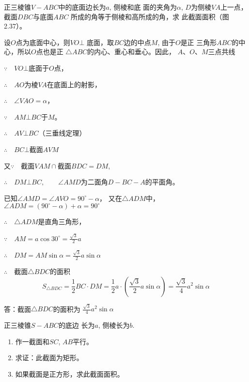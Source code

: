 \begin{example}
    正三棱锥$V-ABC$中的底面边长为$a$, 侧棱和底
面的夹角为$\alpha$, $D$为侧棱$VA$上一点，截面$DBC$与底面$ABC$
所成的角等于侧棱和高所成的角，求
此截面面积（图2.37）。
\end{example}


\begin{solution}
    设$O$点为底面中心，则$VO\bot$
底面，取$BC$边的中点$M$, 由于$O$是正
三角形$ABC$的中心，所以$O$点也是正
$\triangle ABC$的内心、重心和垂心。因此，
$A$、$O$、$M$三点共线

$\because\quad VO\bot$底面于$O$点，

$\therefore\quad AO$为棱$VA$在底面上的射影，

$\therefore\quad \angle VAO=\alpha$，

$\because\quad AM\bot BC$于$M$。

$\therefore\quad AV\bot BC$\qquad （三垂线定理）

$\therefore\quad BC\bot$截面$AVM$

又$\because\quad $截面$VAM\cap$截面$BDC=DM$, 

$\therefore\quad DM\bot BC,\qquad \angle AMD$为二面角$D-BC-A$的平面角。

已知$\angle AMD=\angle AVO=90^{\circ}-\alpha$，
又在$\triangle ADM$中，$\angle ADM=(90^{\circ}-\alpha)+\alpha=90^{\circ}$

$\therefore\quad \triangle ADM$是直角三角形，

$\because\quad AM=a\cos 30^{\circ}=\frac{\sqrt{3}}{2}a$

$\therefore\quad DM=AM\sin\alpha=\frac{\sqrt{3}}{2}a\sin\alpha$

$\therefore\quad $截面$\triangle BDC$的面积
\[S_{\triangle BDC}=\frac{1}{2}BC\cdot DM=\frac{1}{2}a\cdot \left(\frac{\sqrt{3}}{2}a\sin\alpha\right)=\frac{\sqrt{3}}{4}a^2\sin\alpha\]

答：截面$\triangle BDC$的面积为
$\frac{\sqrt{3}}{4}a^2\sin\alpha$
\end{solution}

\begin{example}
    正三棱锥$S-ABC$的底边
    长为$a$, 侧棱长为$b$. 
    
\begin{enumerate}
\item 作一截面和$SC$, $AB$平行。
    \item 求证：此截面为矩形。
    \item 如果截面是正方形，求此截面面积。
\end{enumerate}
\end{example}


